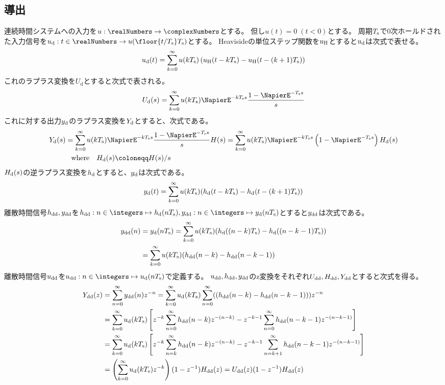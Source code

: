         \subsection{導出}
            連続時間システムへの入力を$u:\realNumbers\to\complexNumbers$とする。
            但し$u(t)=0\;(t<0)$とする。
            周期$T_\text{s}$で0次ホールドされた入力信号を$\ud:t\in\realNumbers\to u(\floor{t/\Ts}\Ts)$とする。
            Heavisideの単位ステップ関数を$u_\text{H}$とすると$u_\text{d}$は次式で表せる。
            \[ u_\text{d}(t) = \sum_{k=0}^\infty u(kT_\text{s})\left(u_\text{H}(t-kT_\text{s}) - u_\text{H}(t-(k+1)T_\text{s})\right) \]
            これのラプラス変換を$U_\text{d}$とすると次式で表される。
            \[ \Ud(s) = \sum_{k=0}^\infty u(k\Ts)\NapierE^{-k\Ts s}\frac{1-\NapierE^{-\Ts s}}{s} \]
            これに対する出力$y_\text{d}$のラプラス変換を$Y_\text{d}$とすると、次式である。
            \begin{align*}
                \Yd(s) &= \sum_{k=0}^\infty u(k\Ts)\NapierE^{-k\Ts s}\frac{1-\NapierE^{-\Ts s}}{s}H(s) = \sum_{k=0}^\infty u(k\Ts)\NapierE^{-k\Ts s}\left(1-\NapierE^{-\Ts s}\right)\Hd(s) \\
                &\phantom{=} \text{where} \quad \Hd(s) \coloneqq H(s)/s
            \end{align*}
            $H_\text{d}(s)$の逆ラプラス変換を$h_\text{d}$とすると、$y_\text{d}$は次式である。
            \[ y_\text{d}(t) = \sum_{k=0}^\infty u(kT_\text{s})(h_\text{d}(t-kT_\text{s})-h_\text{d}(t-(k+1)T_\text{s})) \]
            離散時間信号$h_\text{dd},y_\text{dd}$を$\hdd:n\in\integers\mapsto \hd(n\Ts),\ydd:n\in\integers\mapsto \yd(n\Ts)$とすると$y_\text{dd}$は次式である。
            \begin{align*}
                y_\text{dd}(n) &= y_\text{d}(nT_\text{s}) = \sum_{k=0}^\infty u(kT_\text{s})(h_\text{d}((n-k)T_\text{s})-h_\text{d}((n-k-1)T_\text{s})) \\
                &= \sum_{k=0}^\infty u(kT_\text{s})(h_\text{dd}(n-k)-h_\text{dd}(n-k-1))
            \end{align*}
            離散時間信号$u_\text{dd}$を$\udd:n\in\integers\mapsto\ud(n\Ts)$で定義する。
            $u_\text{dd},h_\text{dd},y_\text{dd}$のz変換をそれぞれ$U_\text{dd},H_\text{dd},Y_\text{dd}$とすると次式を得る。
            \begin{align*}
                Y_\text{dd}(z) &= \sum_{n=0}^\infty y_\text{dd}(n) z^{-n} = \sum_{k=0}^\infty u_\text{d}(kT_\text{s}) \sum_{n=0}^\infty ((h_\text{dd}(n-k)-h_\text{dd}(n-k-1))) z^{-n} \\
                &= \sum_{k=0}^\infty u_\text{d}(kT_\text{s})\left[z^{-k}\sum_{n=0}^\infty h_\text{dd}(n-k)z^{-(n-k)} - z^{-k-1}\sum_{n=0}^\infty h_\text{dd}(n-k-1)z^{-(n-k-1)}\right] \\
                &= \sum_{k=0}^\infty u_\text{d}(kT_\text{s})\left[z^{-k}\sum_{n=k}^\infty h_\text{dd}(n-k)z^{-(n-k)} - z^{-k-1}\sum_{n=k+1}^\infty h_\text{dd}(n-k-1)z^{-(n-k-1)}\right] \\
                &= \left(\sum_{k=0}^\infty u_\text{d}(kT_\text{s})z^{-k}\right)(1-z^{-1})H_\text{dd}(z) = U_\text{dd}(z)(1-z^{-1})H_\text{dd}(z)
            \end{align*}
